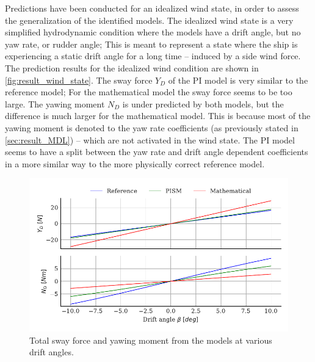 Predictions have been conducted for an idealized wind state, in order to assess the generalization of the  identified models. The idealized wind state is a very simplified hydrodynamic condition where the models have a drift angle, but no yaw rate, or rudder angle; This is meant to represent a state where the ship is experiencing a static drift angle for a long time -- induced by a side wind force.
The prediction results for the idealized wind condition are shown in \autoref{fig:result_wind_state}. The sway force $Y_D$ of the PI model is very similar to the reference model; For the mathematical model the sway force seems to be too large. The yawing moment $N_D$ is under predicted by both models, but the difference is much larger for the mathematical model. 
This is because most of the yawing moment is denoted to the yaw rate coefficients (as previously stated in \autoref{sec:result_MDL}) -- which are not activated in the wind state. 
The PI model seems to have a split between the yaw rate and drift angle dependent coefficients in a more similar way to the more physically correct reference model.
\label{sec:wind_state}
\begin{figure}[h!]
    \includegraphics[width=\columnwidth]{figures/result_wind_state.forces.pdf}
    \caption{Total sway force and yawing moment from the models at various drift angles.}
    \label{fig:result_wind_state}
\end{figure}